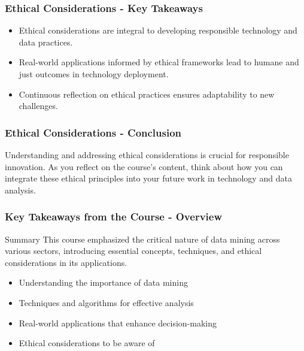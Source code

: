 \documentclass[aspectratio=169]{beamer}
\begin{document}
\begin{frame}[fragile]
    \frametitle{Ethical Considerations - Key Takeaways}
    \begin{itemize}
        \item Ethical considerations are integral to developing responsible technology and data practices.
        \item Real-world applications informed by ethical frameworks lead to humane and just outcomes in technology deployment.
        \item Continuous reflection on ethical practices ensures adaptability to new challenges.
    \end{itemize}
\end{frame}

\begin{frame}[fragile]
    \frametitle{Ethical Considerations - Conclusion}
    Understanding and addressing ethical considerations is crucial for responsible innovation. As you reflect on the course's content, think about how you can integrate these ethical principles into your future work in technology and data analysis.
\end{frame}

\begin{frame}[fragile]
    \frametitle{Key Takeaways from the Course - Overview}
    \begin{block}{Summary}
        This course emphasized the critical nature of data mining across various sectors, introducing essential concepts, techniques, and ethical considerations in its applications. 
        \begin{itemize}
            \item Understanding the importance of data mining
            \item Techniques and algorithms for effective analysis
            \item Real-world applications that enhance decision-making
            \item Ethical considerations to be aware of
        \end{itemize}
    \end{block}
\end{frame}
\end{document}
